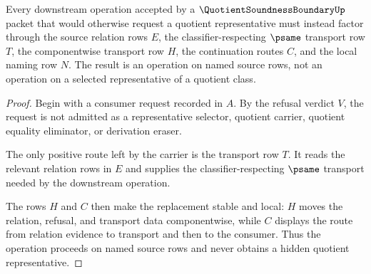 \begin{theorem}
\label{thm:quotient-soundness-boundary-transport-replacement}
Every downstream operation accepted by a $\QuotientSoundnessBoundaryUp$ packet that would otherwise request a quotient representative must instead factor through the source relation rows $E$, the classifier-respecting $\psame$ transport row $T$, the componentwise transport row $H$, the continuation routes $C$, and the local naming row $N$. The result is an operation on named source rows, not an operation on a selected representative of a quotient class.
\end{theorem}
\begin{proof}
Begin with a consumer request recorded in $A$. By the refusal verdict $V$, the request is not admitted as a representative selector, quotient carrier, quotient equality eliminator, or derivation eraser.

The only positive route left by the carrier is the transport row $T$. It reads the relevant relation rows in $E$ and supplies the classifier-respecting $\psame$ transport needed by the downstream operation.

The rows $H$ and $C$ then make the replacement stable and local: $H$ moves the relation, refusal, and transport data componentwise, while $C$ displays the route from relation evidence to transport and then to the consumer. Thus the operation proceeds on named source rows and never obtains a hidden quotient representative.
\end{proof}

